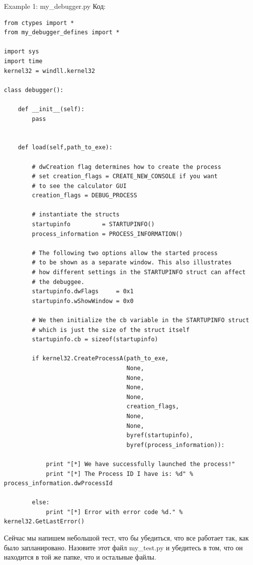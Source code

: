 \documentclass[12pt]{book}
\begin{document}
Example 1: my\_debugger.py
Код:
\begin{lstlisting}
from ctypes import *
from my_debugger_defines import *

import sys
import time
kernel32 = windll.kernel32

class debugger():

    def __init__(self):
        pass
                
                
    def load(self,path_to_exe):
        
        # dwCreation flag determines how to create the process
        # set creation_flags = CREATE_NEW_CONSOLE if you want
        # to see the calculator GUI
        creation_flags = DEBUG_PROCESS
    
        # instantiate the structs
        startupinfo         = STARTUPINFO()
        process_information = PROCESS_INFORMATION()
        
        # The following two options allow the started process
        # to be shown as a separate window. This also illustrates
        # how different settings in the STARTUPINFO struct can affect
        # the debuggee.
        startupinfo.dwFlags     = 0x1
        startupinfo.wShowWindow = 0x0
        
        # We then initialize the cb variable in the STARTUPINFO struct
        # which is just the size of the struct itself
        startupinfo.cb = sizeof(startupinfo)
        
        if kernel32.CreateProcessA(path_to_exe,
                                   None,
                                   None,
                                   None,
                                   None,
                                   creation_flags,
                                   None,
                                   None,
                                   byref(startupinfo),
                                   byref(process_information)):
            
            print "[*] We have successfully launched the process!"
            print "[*] The Process ID I have is: %d" % process_information.dwProcessId
          
        else:    
            print "[*] Error with error code %d." % kernel32.GetLastError()
\end{lstlisting}

Сейчас мы напишем небольшой тест, что бы убедиться, что все работает так, как было запланировано. Назовите этот файл my\_test.py и убедитесь в том, что он находится в той же папке, что и остальные файлы.
\end{document}
